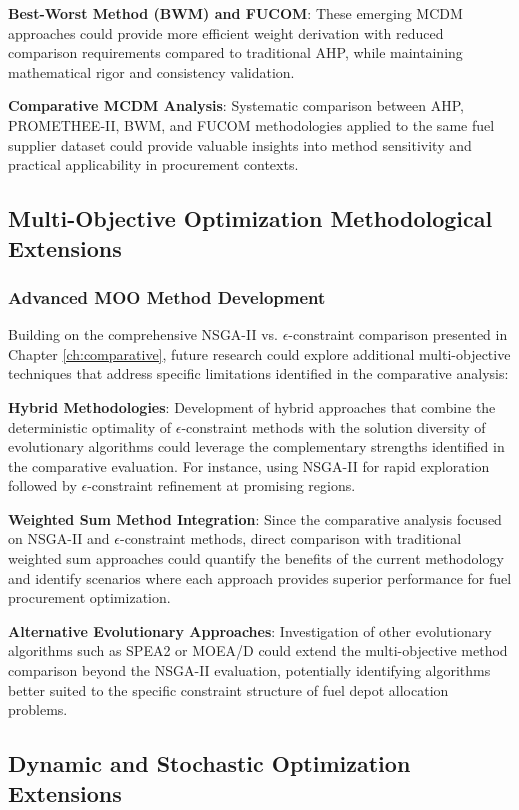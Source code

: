\textbf{Best-Worst Method (BWM) and FUCOM}: These emerging MCDM approaches could provide more efficient weight derivation with reduced comparison requirements compared to traditional AHP, while maintaining mathematical rigor and consistency validation.

\textbf{Comparative MCDM Analysis}: Systematic comparison between AHP, PROMETHEE-II, BWM, and FUCOM methodologies applied to the same fuel supplier dataset could provide valuable insights into method sensitivity and practical applicability in procurement contexts.

\subsection{Multi-Objective Optimization Methodological Extensions}

\subsubsection{Advanced MOO Method Development}
Building on the comprehensive NSGA-II vs. $\epsilon$-constraint comparison presented in Chapter \ref{ch:comparative}, future research could explore additional multi-objective techniques that address specific limitations identified in the comparative analysis:

\textbf{Hybrid Methodologies}: Development of hybrid approaches that combine the deterministic optimality of $\epsilon$-constraint methods with the solution diversity of evolutionary algorithms could leverage the complementary strengths identified in the comparative evaluation. For instance, using NSGA-II for rapid exploration followed by $\epsilon$-constraint refinement at promising regions.

\textbf{Weighted Sum Method Integration}: Since the comparative analysis focused on NSGA-II and $\epsilon$-constraint methods, direct comparison with traditional weighted sum approaches could quantify the benefits of the current methodology and identify scenarios where each approach provides superior performance for fuel procurement optimization.

\textbf{Alternative Evolutionary Approaches}: Investigation of other evolutionary algorithms such as SPEA2 or MOEA/D could extend the multi-objective method comparison beyond the NSGA-II evaluation, potentially identifying algorithms better suited to the specific constraint structure of fuel depot allocation problems.

\subsection{Dynamic and Stochastic Optimization Extensions}

